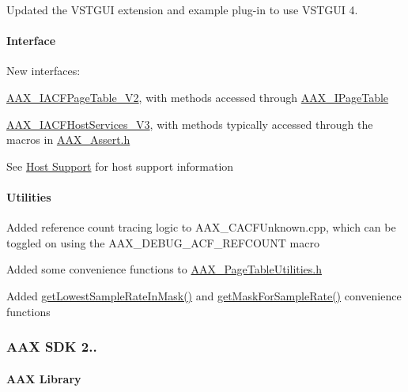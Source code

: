 \begin{DoxyItemize}
\item Updated the V\+S\+T\+G\+U\+I extension and example plug-\/in to use V\+S\+T\+G\+U\+I 4.  
\end{DoxyItemize}\hypertarget{a00375_aax_sdk_2p3p1_Interface}{}\paragraph{Interface}\label{a00375_aax_sdk_2p3p1_Interface}

\begin{DoxyItemize}
\item New interfaces\+: 
\begin{DoxyItemize}
\item \hyperlink{a00075}{A\+A\+X\+\_\+\+I\+A\+C\+F\+Page\+Table\+\_\+\+V2}, with methods accessed through \hyperlink{a00107}{A\+A\+X\+\_\+\+I\+Page\+Table} 
\item \hyperlink{a00073}{A\+A\+X\+\_\+\+I\+A\+C\+F\+Host\+Services\+\_\+\+V3}, with methods typically accessed through the macros in \hyperlink{a00158}{A\+A\+X\+\_\+\+Assert.\+h} 
\end{DoxyItemize}See \hyperlink{a00373}{Host Support} for host support information  
\end{DoxyItemize}\hypertarget{a00375_aax_sdk_2p3p1_Utilities}{}\paragraph{Utilities}\label{a00375_aax_sdk_2p3p1_Utilities}

\begin{DoxyItemize}
\item Added reference count tracing logic to A\+A\+X\+\_\+\+C\+A\+C\+F\+Unknown.\+cpp, which can be toggled on using the {\ttfamily A\+A\+X\+\_\+\+D\+E\+B\+U\+G\+\_\+\+A\+C\+F\+\_\+\+R\+E\+F\+C\+O\+U\+N\+T} macro  
\item Added some convenience functions to \hyperlink{a00274}{A\+A\+X\+\_\+\+Page\+Table\+Utilities.\+h}  
\item Added \hyperlink{a00149_a7ed6789141267c2270b49ef9a38bd55a}{get\+Lowest\+Sample\+Rate\+In\+Mask()} and \hyperlink{a00149_a35608eb248567091abba77878fb87eab}{get\+Mask\+For\+Sample\+Rate()} convenience functions  
\end{DoxyItemize}\hypertarget{a00375_aax_sdk_2p3p0}{}\subsubsection{A\+A\+X S\+D\+K 2..}\label{a00375_aax_sdk_2p3p0}
\hypertarget{a00375_aax_sdk_2p3p0_AAXLibrary}{}\paragraph{A\+A\+X Library}\label{a00375_aax_sdk_2p3p0_AAXLibrary}

